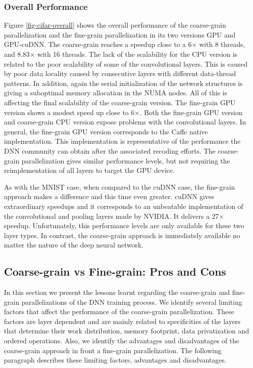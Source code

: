 \subsubsection{Overall Performance}
Figure \ref{fig-cifar-overall} shows the overall performance of
the coarse-grain parallelization and the fine-grain parallelization in
its two versions GPU and GPU-cuDNN. The coarse-grain reaches a speedup
close to a 6$\times$ with 8 threads, and 8.83$\times$ with 16 threads. The lack of
the scalability for the CPU version is related to the poor scalability
of some of the convolutional layers. This is caused by poor data locality caused by consecutive layers with different data-thread patterns. 
In addition, again the serial initialization of
the network structures is giving a suboptimal memory allocation in
the NUMA nodes. All of this is affecting the final scalability of
the coarse-grain version. The fine-grain GPU version shows a
modest speed up close to 6$\times$. Both the fine-grain GPU version and 
coarse-grain CPU version expose problems with the convolutional layers.
In general, the fine-grain GPU version corresponds to the Caffe native 
implementation. This implementation is representative of the 
performance the DNN community can obtain after the associated recoding 
efforts. The coarse-grain parallelization gives similar performance levels, but not requiring the reimplementation of all layers to target the GPU device. 

As with the MNIST case, when compared to the cuDNN case, the fine-grain 
approach makes a difference and this time even greater. cuDNN gives 
extraordinary speedups and it corresponds to an unbeatable implementation 
of the convolutional and pooling layers made by NVIDIA. It delivers a 
27$\times$ speedup. Unfortunately, this performance levels are only available 
for these two layer types. In contrast, the coarse-grain approach is 
immediately available no matter the nature of the deep neural network.

\subsection{Coarse-grain vs Fine-grain: Pros and Cons}
In this section we present the lessons learnt regarding the coarse-grain 
and fine-grain parallelizations of the DNN training process. We identify 
several limiting factors that affect the performance of the 
coarse-grain parallelization. These factors are layer dependent and are 
mainly related to specificities of the layers that determine their 
work distribution, memory footprint, data privatization and ordered 
operations. Also, we identify the advantages and disadvantages of 
the coarse-grain approach in front a fine-grain parallelization. 
The following paragraph describes these limiting factors, 
advantages and disadvantages.

